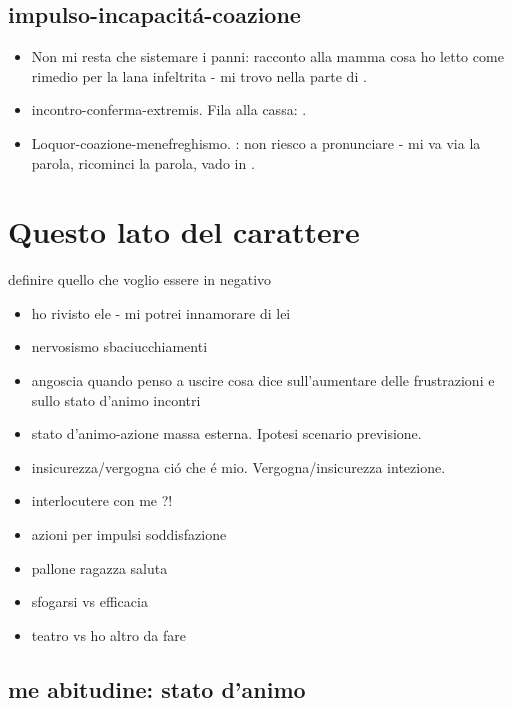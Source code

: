 \subsection{impulso-incapacit\'a-coazione}

\begin{itemize}
\item Non mi resta che sistemare i panni: racconto alla mamma cosa ho letto come rimedio per la lana infeltrita - mi trovo nella parte di .
\item incontro-conferma-extremis. Fila alla cassa: .
\item Loquor-coazione-menefreghismo. : non riesco a pronunciare - mi va via la parola, ricominci la parola, vado in .
\end{itemize}


\section{Questo lato del carattere}

definire quello che voglio essere in negativo

\begin{itemize}
\item ho rivisto ele - mi potrei innamorare di lei
\item nervosismo sbaciucchiamenti
\item angoscia quando penso a uscire cosa dice sull'aumentare delle frustrazioni e sullo stato d'animo incontri
\item stato d'animo-azione massa esterna. Ipotesi scenario previsione.
\item insicurezza/vergogna ci\'o che \'e mio. Vergogna/insicurezza intezione. 
\item interlocutere con me ?!
\item azioni per impulsi soddisfazione
\item pallone ragazza saluta
\item sfogarsi vs efficacia 
\item teatro vs ho altro da fare
\end{itemize}

\subsection{me abitudine: stato d'animo}

